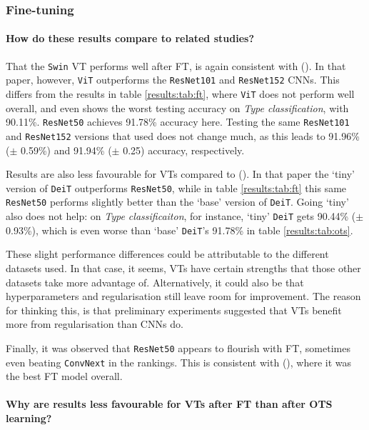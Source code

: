 \subsubsection{Fine-tuning} \label{exp:int:ft}

\paragraph{How do these results compare to related studies?}
That the \texttt{Swin} VT performs well after FT, is again consistent with \citeauthor{zhou2021convnets} (\citeyear{zhou2021convnets}). In that paper, however, \texttt{ViT} outperforms the \texttt{ResNet101} and \texttt{ResNet152} CNNs. This differs from the results in table \ref{results:tab:ft}, where \texttt{ViT} does not perform well overall, and even shows the worst testing accuracy on \textit{Type classification}, with 90.11\%. \texttt{ResNet50} achieves 91.78\% accuracy here. Testing the same \texttt{ResNet101} and \texttt{ResNet152} versions that \citeauthor{zhou2021convnets} used does not change much, as this leads to 91.96\% ($\pm$ 0.59\%) and 91.94\% ($\pm$ 0.25) accuracy, respectively.

Results are also less favourable for VTs compared to \citeauthor{matsoukas2021time} (\citeyear{matsoukas2021time}). In that paper the `tiny' version of \texttt{DeiT} outperforms \texttt{ResNet50}, while in table \ref{results:tab:ft} this same \texttt{ResNet50} performs slightly better than the `base' version of \texttt{DeiT}. Going `tiny' also does not help: on \textit{Type classificaiton}, for instance, `tiny' \texttt{DeiT} gets 90.44\% ($\pm$ 0.93\%), which is even worse than `base' \texttt{DeiT}'s 91.78\% in table \ref{results:tab:ots}.

These slight performance differences could be attributable to the different datasets used. In that case, it seems, VTs have certain strengths that those other datasets take more advantage of. Alternatively, it could also be that hyperparameters and regularisation still leave room for improvement. The reason for thinking this, is that preliminary experiments suggested that VTs benefit more from regularisation than CNNs do.

Finally, it was observed that \texttt{ResNet50} appears to flourish with FT, sometimes even beating \texttt{Conv\-Next} in the rankings. This is consistent with \citeauthor{sabatelli2018deep} (\citeyear{sabatelli2018deep}), where it was the best FT model overall.

\paragraph{Why are results less favourable for VTs after FT than after OTS learning?}

